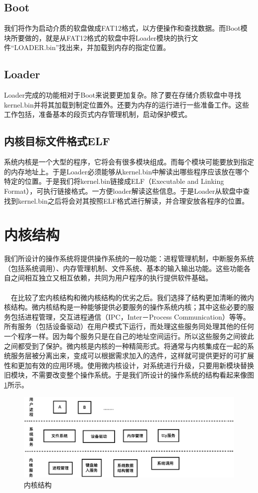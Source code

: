 \documentclass[UTF8,nofonts,cs4size]{ctexrep}
\begin{document}
\subsection{Boot}
我们将作为启动介质的软盘做成FAT12格式，以方便操作和查找数据。而Boot模块所要做的，就是从FAT12格式的软盘中将Loader模块的执行文件“LOADER.bin”找出来，并加载到内存的指定位置。
\subsection{Loader}
Loader完成的功能相对于Boot来说要更加复杂。除了要在存储介质软盘中寻找kernel.bin并将其加载到制定位置外。还要为内存的运行进行一些准备工作。这些工作包括，准备基本的段页式内存管理机制，启动保护模式。
\subsection{内核目标文件格式ELF}
系统内核是一个大型的程序，它将会有很多模块组成。而每个模块可能要放到指定的内存地址上。于是Loader必须能够从kernel.bin中解读出哪些程序应该放在哪个特定的位置。于是我们将kernel.bin链接成ELF（Executable and Linking Format），可执行链接格式。一方便loader解读这些信息。于是Loader从软盘中查找到kernel.bin之后将会对其按照ELF格式进行解读，并合理安放各程序的位置。

\section{内核结构}
我们所设计的操作系统将提供操作系统的一般功能：进程管理机制，中断服务系统（包括系统调用）、内存管理机制、文件系统、基本的输入输出功能。这些功能各自之间相互独立又相互依赖，共同为用户程序的执行提供软件基础。
\paragraph{}
\indent \ \ 
在比较了宏内核结构和微内核结构的优劣之后。我们选择了结构更加清晰的微内核结构。微内核结构是一种能够提供必要服务的操作系统内核；其中这些必要的服务包括进程管理，交互进程通信（IPC，Inter－Process Communication）等等。所有服务（包括设备驱动）在用户模式下运行，而处理这些服务同处理其他的任何一个程序一样。因为每个服务只是在自己的地址空间运行。所以这些服务之间彼此之间都受到了保护。微内核是内核的一种精简形式。将通常与内核集成在一起的系统服务层被分离出来，变成可以根据需求加入的选件，这样就可提供更好的可扩展性和更加有效的应用环境。使用微内核设计，对系统进行升级，只要用新模块替换旧模块，不需要改变整个操作系统。于是我们所设计的操作系统的结构看起来像图\ref{osstruct}所示。
\begin{figure}[htp]
\centering
\includegraphics[scale=0.38]{osstruct.eps}
\caption{内核结构}
\label{osstruct}
\end{figure}
\end{document}
